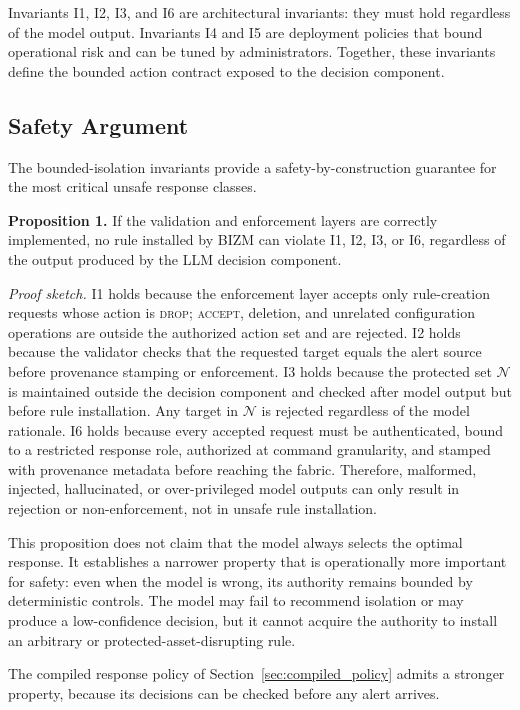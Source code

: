 \documentclass[final,5p]{elsarticle}
\begin{document}
Invariants I1, I2, I3, and I6 are architectural invariants: they must hold regardless of the model output. Invariants I4 and I5 are deployment policies that bound operational risk and can be tuned by administrators. Together, these invariants define the bounded action contract exposed to the decision component.

\subsection{Safety Argument}
\label{sec:safety_argument}

The bounded-isolation invariants provide a safety-by-construction guarantee for the most critical unsafe response classes.

\textbf{Proposition 1.}
If the validation and enforcement layers are correctly implemented, no rule installed by BIZM can violate I1, I2, I3, or I6, regardless of the output produced by the LLM decision component.

\textit{Proof sketch.}
I1 holds because the enforcement layer accepts only rule-creation requests whose action is \textsc{drop}; \textsc{accept}, deletion, and unrelated configuration operations are outside the authorized action set and are rejected. I2 holds because the validator checks that the requested target equals the alert source before provenance stamping or enforcement. I3 holds because the protected set $\mathcal{N}$ is maintained outside the decision component and checked after model output but before rule installation. Any target in $\mathcal{N}$ is rejected regardless of the model rationale. I6 holds because every accepted request must be authenticated, bound to a restricted response role, authorized at command granularity, and stamped with provenance metadata before reaching the fabric. Therefore, malformed, injected, hallucinated, or over-privileged model outputs can only result in rejection or non-enforcement, not in unsafe rule installation.

This proposition does not claim that the model always selects the optimal response. It establishes a narrower property that is operationally more important for safety: even when the model is wrong, its authority remains bounded by deterministic controls. The model may fail to recommend isolation or may produce a low-confidence decision, but it cannot acquire the authority to install an arbitrary or protected-asset-disrupting rule.

The compiled response policy of Section~\ref{sec:compiled_policy} admits a stronger property, because its decisions can be checked before any alert arrives.
\end{document}

